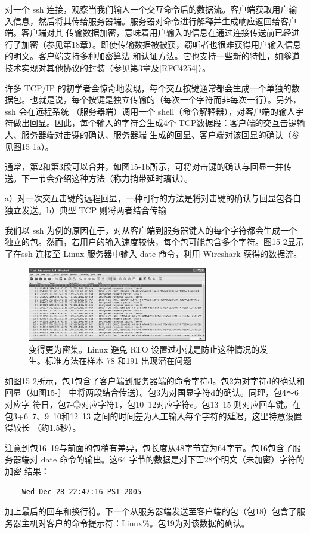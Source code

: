 对一个 ssh 连接，观察当我们输人一个交互命令后的数据流。客户端获取用户输入信息，然后将其传给服务器端。服务器对命令进行解释并生成响应返回给客户端。客户端对其
传输数据加密，意味着用户输入的信息在通过连接传送前已经进行了加密（参见第18章）。即使传输数据被被获，窃听者也很难获得用户输入信息的明文。客户端支持多种加密算法
和认证方法。它也支持一些新的特性，如隧道技术实现对其他协议的封装（参见第3章及\href{https://www.rfc-editor.org/rfc/rfc4254}{[RFC4254]}）。

许多 TCP/IP 的初学者会惊奇地发现，每个交互按键通常都会生成一个单独的数据包。也就是说，每个按键是独立传输的（每次一个字符而非每次一行）。另外，ssh 会在远程系统
（服务器端）调用一个 shell（命令解释器），对客户端的输人字符做出回显。因此，每个输人的字符会生成4个 TCP数据段：客户端的交互击键输人、服务器端对击键的确认、服务器端
生成的回显、客户端对该回显的确认（参见图15-1a）。

通常，第2和第3段可以合并，如图15-1b所示，可将对击键的确认与回显一并传送。下一节会介绍这种方法（称力捎带延时璃认）。

a）对一次交互击键的远程回显，一种可行的方法是将对击键的确认与回显包各自独立发送。b）典型 TCP 则将两者结合传输

我们以 ssh 为例的原因在于，对从客户端到服务器键人的每个字符都会生成一个独立的包。然而，若用户的输入速度较快，每个包可能包含多个字符。图15-2显示了在ssh 连接至
Linux 服务器中输入 date 命令，利用 Wireshark 获得的数据流。

\begin{figure}[!htb]
    \centering
	\includegraphics[width=0.7\textwidth]{imgs/15/15-2.png}
	\caption{变得更为密集。Linux 避免 RTO 设置过小就是防止这种情况的发生。标准方法在样本 78 和191 出现潜在问题}
\end{figure}

如图15-2所示，包1包含了客户端到服务器端的命令字符d。包2为对字符d的确认和回显（如图15-］ 中将两段结合传送）。包3为对国显字符d的确认。同理，包4～6对应字
符日，包7-◎对应字符1，包10~12对应字符e。包13~15 则对应回车键。在包3+6~7、9~10和12~13 之间的时间差为人工输入每个字符的延迟，这里特意设置得较长
（约1.5秒）。

注意到包16~19与前面的包稍有差异，包长度从48字节变为64字节。包16包含了服务器端对 date 命令的输出。这64 字节的数据是对下面28个明文（未加密）字符的加密
结果：
\begin{verbatim}
    Wed Dec 28 22:47:16 PST 2005
\end{verbatim}
加上最后的回车和换行符。下一个从服务器端发送至客户端的包（包18）包含了服务器主机对客户的命令提示符：Linux\%。包19为对该数据的确认。

